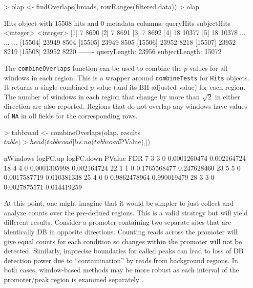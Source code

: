 \documentclass[12pt]{report}
\renewenvironment{Schunk}{\vspace{0pt}}{\vspace{0pt}}
\newcommand{\code}[1]{{\small\texttt{#1}}}
\begin{document}
\begin{Schunk}
\begin{Sinput}
> olap <- findOverlaps(broads, rowRanges(filtered.data))
> olap
\end{Sinput}
\begin{Soutput}
Hits object with 15508 hits and 0 metadata columns:
          queryHits subjectHits
          <integer>   <integer>
      [1]         7        8690
      [2]         7        8691
      [3]         7        8692
      [4]        18       10377
      [5]        18       10378
      ...       ...         ...
  [15504]     23949        8504
  [15505]     23949        8505
  [15506]     23952        8218
  [15507]     23952        8219
  [15508]     23952        8220
  -------
  queryLength: 23956
  subjectLength: 15072
\end{Soutput}
\end{Schunk}

The \code{combineOverlaps} function can be used to combine the $p$-values for all windows in each region. 
This is a wrapper around \code{combineTests} for \code{Hits} objects.
It returns a single combined $p$-value (and its BH-adjusted value) for each region. 
The number of windows in each region that change by more than $\sqrt{2}$ in either direction are also reported.
Regions that do not overlap any windows have values of \code{NA} in all fields for the corresponding rows.

\begin{Schunk}
\begin{Sinput}
> tabbroad <- combineOverlaps(olap, results$table)
> head(tabbroad[!is.na(tabbroad$PValue),])
\end{Sinput}
\begin{Soutput}
   nWindows logFC.up logFC.down       PValue         FDR
7         3        3          0 0.0001260474 0.002164724
18        4        4          0 0.0001305998 0.002164724
22        1        1          0 0.1765568477 0.247628460
23        5        5          0 0.0017587719 0.010381338
25        4        0          0 0.9862478964 0.990019479
28        3        3          0 0.0027875571 0.014419259
\end{Soutput}
\end{Schunk}

At this point, one might imagine that it would be simpler to just collect and analyze counts over the pre-defined regions. 
This is a valid strategy but will yield different results. 
Consider a promoter containing two separate sites that are identically DB in opposite directions. 
Counting reads across the promoter will give equal counts for each condition so changes within the promoter will not be detected. 
Similarly, imprecise boundaries for called peaks can lead to loss of DB detection power due to ``contamination'' by reads from background regions. 
In both cases, window-based methods may be more robust as each interval of the promoter/peak region is examined separately \citep{lun2014}.
\end{document}

